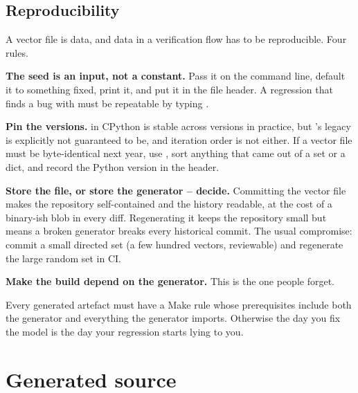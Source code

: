 \subsection{Reproducibility}

A vector file is data, and data in a verification flow has to be
reproducible. Four rules.

\textbf{The seed is an input, not a constant.} Pass it on the command line,
default it to something fixed, print it, and put it in the file header. A
regression that finds a bug with  must be repeatable by
typing .

\textbf{Pin the versions.}  in CPython is stable
across versions in practice, but 's legacy 
is explicitly not guaranteed to be, and  iteration order is not
either. If a vector file must be byte-identical next year, use
, sort anything that came out of a set or a dict, and
record the Python version in the header.

\textbf{Store the file, or store the generator -- decide.} Committing the
vector file makes the repository self-contained and the history readable, at
the cost of a binary-ish blob in every diff. Regenerating it keeps the
repository small but means a broken generator breaks every historical commit.
The usual compromise: commit a small directed set (a few hundred vectors,
reviewable) and regenerate the large random set in CI.

\textbf{Make the build depend on the generator.} This is the one people
forget.


\begin{ruleofthumb}
Every generated artefact must have a Make rule whose prerequisites include
both the generator and everything the generator imports. Otherwise the day
you fix the model is the day your regression starts lying to you.
\end{ruleofthumb}

\section{Generated source}
\label{sec:python:generated}

